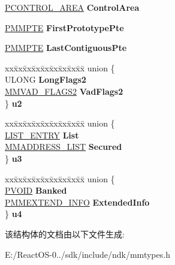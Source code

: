 \begin{DoxyCompactItemize}
\begin{tabbing}
\end{tabbing}\item 
\mbox{\label{struct___m_m_v_a_d___l_o_n_g_abaf583109f8002b90e6ab042befc3042}} 
\hyperlink{struct___c_o_n_t_r_o_l___a_r_e_a}{P\+C\+O\+N\+T\+R\+O\+L\+\_\+\+A\+R\+EA} {\bfseries Control\+Area}
\item 
\mbox{\label{struct___m_m_v_a_d___l_o_n_g_a2352ef182045dd872ac8f7bd55e3d099}} 
\hyperlink{struct___m_m_p_t_e}{P\+M\+M\+P\+TE} {\bfseries First\+Prototype\+Pte}
\item 
\mbox{\label{struct___m_m_v_a_d___l_o_n_g_a1013ca3ac89d546a6ba359e565f13376}} 
\hyperlink{struct___m_m_p_t_e}{P\+M\+M\+P\+TE} {\bfseries Last\+Contiguous\+Pte}
\item 
\mbox{\label{struct___m_m_v_a_d___l_o_n_g_a1c007ef54975cce135c285099b569871}} 
\begin{tabbing}
xx\=xx\=xx\=xx\=xx\=xx\=xx\=xx\=xx\=\kill
union \{\\
\>ULONG {\bfseries LongFlags2}\\
\>\hyperlink{struct___m_m_v_a_d___f_l_a_g_s2}{MMVAD\_FLAGS2} {\bfseries VadFlags2}\\
\} {\bfseries u2}\\

\end{tabbing}\item 
\mbox{\label{struct___m_m_v_a_d___l_o_n_g_ad39307118c42ce169f86a671258aefce}} 
\begin{tabbing}
xx\=xx\=xx\=xx\=xx\=xx\=xx\=xx\=xx\=\kill
union \{\\
\>\hyperlink{struct___l_i_s_t___e_n_t_r_y}{LIST\_ENTRY} {\bfseries List}\\
\>\hyperlink{struct___m_m_a_d_d_r_e_s_s___l_i_s_t}{MMADDRESS\_LIST} {\bfseries Secured}\\
\} {\bfseries u3}\\

\end{tabbing}\item 
\mbox{\label{struct___m_m_v_a_d___l_o_n_g_a66fc1b7b9f062ba8de247465c8887a06}} 
\begin{tabbing}
xx\=xx\=xx\=xx\=xx\=xx\=xx\=xx\=xx\=\kill
union \{\\
\>\hyperlink{interfacevoid}{PVOID} {\bfseries Banked}\\
\>\hyperlink{struct___m_m_e_x_t_e_n_d___i_n_f_o}{PMMEXTEND\_INFO} {\bfseries ExtendedInfo}\\
\} {\bfseries u4}\\

\end{tabbing}\end{DoxyCompactItemize}


该结构体的文档由以下文件生成\+:\begin{DoxyCompactItemize}
\item 
E\+:/\+React\+O\+S-\/0../sdk/include/ndk/mmtypes.\+h\end{DoxyCompactItemize}
